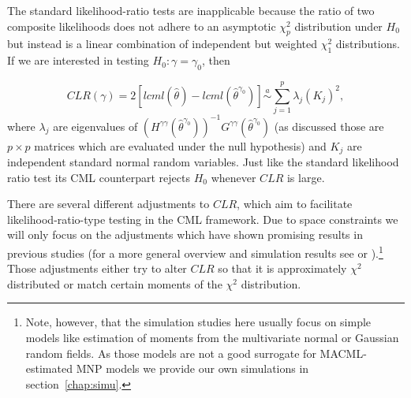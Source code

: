 \documentclass[12pt, a4paper]{article}
\numberwithin{defcounter}{section}
\numberwithin{excounter}{section}
\begin{document}
The standard likelihood-ratio tests are inapplicable because the ratio of two composite likelihoods does not adhere to an asymptotic $\chi_p^2$ distribution under $H_0$ but instead is a linear combination of independent but weighted $\chi_1^2$ distributions. If we are interested in testing $H_0: \gamma = \gamma_0$, then

\begin{equation}
\label{eq:CLR}
CLR(\gamma) = 2[lcml(\hat{\theta}) - lcml(\hat{\theta}^{\gamma_0})] \overset{a}{\sim} \sum_{j=1}^{p} \lambda_{j} (K_{j})^2,
\end{equation}
where $\lambda_j$ are eigenvalues of
$(H^{\gamma\gamma}(\hat{\theta}^{\gamma_0}))^{-1}G^{\gamma\gamma}(\hat{\theta}^{\gamma_0})$ (as discussed those are $p \times p$ matrices which are evaluated under the null hypothesis) and $K_j$ are independent standard normal random variables. Just like the standard likelihood ratio test its \ac{CML} counterpart rejects $H_0$ whenever $CLR$ is large.

There are several different adjustments to $CLR$, which aim to facilitate likelihood-ratio-type testing in the \ac{CML} framework. Due to space constraints we will only focus on the adjustments which have shown promising results in previous studies (for a more general overview and simulation results see \cite{pace2011} or \cite{cattelan2016}).\footnote{Note, however, that the simulation studies here usually focus on simple models like estimation of moments from the multivariate normal or Gaussian random fields. As those models are not a good surrogate for \ac{MACML}-estimated \ac{MNP} models  we provide our own simulations in section~\ref{chap:simu}.} Those adjustments either try to alter $CLR$ so that it is approximately $\chi^2$ distributed or match certain moments of the $\chi^2$ distribution.
\end{document}
